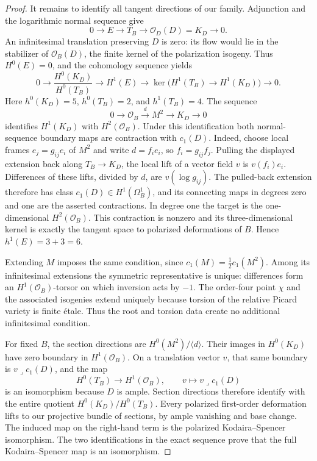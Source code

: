 \documentclass[11pt]{amsart}
\theoremstyle{definition}
\theoremstyle{remark}
\numberwithin{equation}{section}
\begin{document}
\begin{proof}
It remains to identify all tangent directions of our family.
Adjunction and the logarithmic normal sequence give
\[
 0\longrightarrow E\longrightarrow T_B
       \longrightarrow\mathcal O_D(D)=K_D\longrightarrow0.
\]
An infinitesimal translation preserving $D$ is zero: its flow would
lie in the stabilizer of $\mathcal O_B(D)$, the finite kernel of
the polarization isogeny.  Thus $H^0(E)=0$, and the cohomology
sequence yields
\[
 0\longrightarrow
 \frac{H^0(K_D)}{H^0(T_B)}
 \longrightarrow H^1(E)\longrightarrow
 \ker\bigl(H^1(T_B)\longrightarrow H^1(K_D)\bigr)
 \longrightarrow0.
\]
Here $h^0(K_D)=5$, $h^0(T_B)=2$, and $h^1(T_B)=4$.
The sequence
\[
 0\longrightarrow\mathcal O_B\xrightarrow{\ d\ }M^2
       \longrightarrow K_D\longrightarrow0
\]
identifies $H^1(K_D)$ with $H^2(\mathcal O_B)$.  Under this
identification both normal-sequence boundary maps are contraction
with $c_1(D)$.  Indeed, choose local frames $e_j=g_{ij}e_i$ of
$M^2$ and write $d=f_i e_i$, so $f_i=g_{ij}f_j$.
Pulling the displayed extension back along $T_B\to K_D$, the
local lift of a vector field $v$ is $v(f_i)e_i$.
Differences of these lifts, divided by $d$, are
$v(\log g_{ij})$.  The pulled-back extension therefore has
class $c_1(D)\in H^1(\Omega_B^1)$, and its connecting maps in
degrees zero and one are the asserted contractions.
In degree one the target is the one-dimensional $H^2(\mathcal O_B)$.
This contraction is nonzero and its three-dimensional kernel is exactly the tangent
space to polarized deformations of $B$.  Hence $h^1(E)=3+3=6$.

Extending $M$ imposes the same condition, since
$c_1(M)=\tfrac12c_1(M^2)$.  Among its infinitesimal extensions
the symmetric representative is unique: differences form an
$H^1(\mathcal O_B)$-torsor on which inversion acts by $-1$.
The order-four point $\chi$ and the associated isogenies extend
uniquely because torsion of the relative Picard variety is finite
étale.  Thus the root and torsion data create no additional
infinitesimal condition.

For fixed $B$, the section directions are
$H^0(M^2)/\langle d\rangle$.  Their images in $H^0(K_D)$ have zero
boundary in $H^1(\mathcal O_B)$.  On a translation vector $v$, that
same boundary is $v\mathbin{\lrcorner}c_1(D)$, and the map
\[
 H^0(T_B)\longrightarrow H^1(\mathcal O_B),\qquad
 v\longmapsto v\mathbin{\lrcorner}c_1(D)
\]
is an isomorphism because $D$ is ample.  Section directions
therefore identify with the entire quotient
$H^0(K_D)/H^0(T_B)$.  Every polarized first-order deformation lifts
to our projective bundle of sections, by ample vanishing and base
change.  The induced map on the right-hand term is the polarized
Kodaira--Spencer isomorphism.  The two identifications in the exact
sequence prove that the full Kodaira--Spencer map is an isomorphism.
\end{proof}
\end{document}
